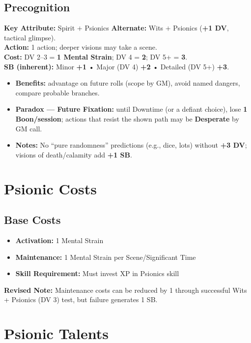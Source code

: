 \documentclass[11pt,twoside]{article}
\begin{document}

\subsection{Precognition}
\textbf{Key Attribute:} Spirit $+$ Psionics \quad
\textbf{Alternate:} Wits $+$ Psionics (\textbf{+1 DV}, tactical glimpse). \\
\textbf{Action:} 1 action; deeper visions may take a scene. \\
\textbf{Cost:} DV 2--3 = \textbf{1 Mental Strain}; DV 4 = \textbf{2}; DV 5+ = \textbf{3}. \\
\textbf{SB (inherent):} Minor \textbf{+1} • Major (DV 4) \textbf{+2} • Detailed (DV 5+) \textbf{+3}.
\begin{itemize}[leftmargin=*]
  \item \textbf{Benefits:} advantage on future rolls (scope by GM), avoid named dangers, compare probable branches.
  \item \textbf{Paradox --- Future Fixation:} until Downtime (or a defiant choice), lose \textbf{1 Boon/session}; actions that resist the shown path may be \textbf{Desperate} by GM call.
  \item \textbf{Notes:} No ``pure randomness'' predictions (e.g., dice, lots) without \textbf{+3 DV}; visions of death/calamity add \textbf{+1 SB}.
\end{itemize}

\section*{Psionic Costs}

\subsection{Base Costs}
\begin{itemize}[leftmargin=*]
    \item \textbf{Activation:} 1 Mental Strain
    \item \textbf{Maintenance:} 1 Mental Strain per Scene/Significant Time
    \item \textbf{Skill Requirement:} Must invest XP in Psionics skill
\end{itemize}

\textbf{Revised Note:} Maintenance costs can be reduced by 1 through successful Wits + Psionics (DV 3) test, but failure generates 1 SB.

\section*{Psionic Talents}
\end{document}
